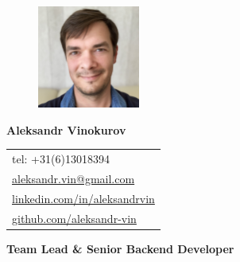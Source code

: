\documentclass[letterpaper, 11pt]{article}
\begin{document}
\begin{figure} %
  \vspace{-5ex} %
  \includegraphics[width=0.3\textwidth]{me.jpg} %
\end{figure}

\noindent\textbf{\Huge Aleksandr Vinokurov} 

\vspace{1em}

\noindent
\begin{tabular}{@{\hspace{5mm}}l}
tel: +31(6)13018394 \\
\href{mailto:aleksandr.vin@gmail.com}{aleksandr.vin@gmail.com} \\
\href{https://linkedin.com/in/aleksandrvin}{linkedin.com/in/aleksandrvin} \\
\href{https://github.com/aleksandr-vin}{github.com/aleksandr-vin}
\end{tabular}

\vspace{1em}

\noindent\parbox{\linewidth}{\raggedright\textbf{\Large Team Lead \& Senior Backend Developer}} %

\vspace{1em}








\end{document}
